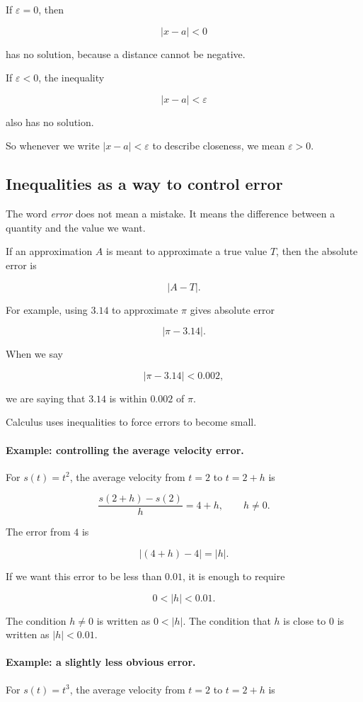 If \(\varepsilon=0\), then

\[
|x-a|<0
\]

has no solution, because a distance cannot be negative.

If \(\varepsilon<0\), the inequality

\[
|x-a|<\varepsilon
\]

also has no solution.

So whenever we write \(|x-a|<\varepsilon\) to describe closeness, we mean \(\varepsilon>0\).

\subsection{Inequalities as a way to control error}
\label{subsec:inequalities-control-error}

The word \emph{error} does not mean a mistake. It means the difference between a quantity and the value we want.

If an approximation \(A\) is meant to approximate a true value \(T\), then the absolute error is

\[
|A-T|.
\]

For example, using \(3.14\) to approximate \(\pi\) gives absolute error

\[
|\pi-3.14|.
\]

When we say

\[
|\pi-3.14|<0.002,
\]

we are saying that \(3.14\) is within \(0.002\) of \(\pi\).

Calculus uses inequalities to force errors to become small.

\paragraph{Example: controlling the average velocity error.}
For \(s(t)=t^2\), the average velocity from \(t=2\) to \(t=2+h\) is

\[
\frac{s(2+h)-s(2)}{h}=4+h,
\qquad h\neq 0.
\]

The error from \(4\) is

\[
|(4+h)-4|=|h|.
\]

If we want this error to be less than \(0.01\), it is enough to require

\[
0<|h|<0.01.
\]

The condition \(h\neq 0\) is written as \(0<|h|\). The condition that \(h\) is close to \(0\) is written as \(|h|<0.01\).

\paragraph{Example: a slightly less obvious error.}
For \(s(t)=t^3\), the average velocity from \(t=2\) to \(t=2+h\) is

